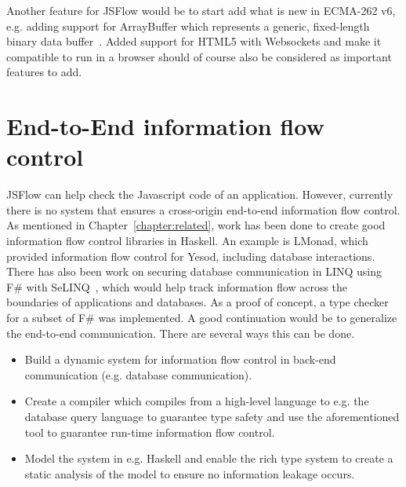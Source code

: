 Another feature for JSFlow would be to start add what is new in ECMA-262 v6, e.g. adding support for ArrayBuffer which represents a generic, fixed-length binary data buffer~\cite{js_arraybuffer}. Added support for HTML5 with Websockets and make it compatible to run in a browser should of course also be considered as important features to add.

\section{End-to-End information flow control}
JSFlow can help check the Javascript code of an application. However, currently there is no system that ensures a cross-origin end-to-end information flow control. As mentioned in Chapter~\ref{chapter:related}, work has been done to create good information flow control libraries in Haskell. An example is LMonad, which provided information flow control for Yesod, including database interactions. There has also been work on securing database communication in LINQ using F\# with SeLINQ~\cite{selinq}, which would help track information flow across the boundaries of applications and databases. As a proof of concept, a type checker for a subset of F\# was implemented. A good continuation would be to generalize the end-to-end communication. There are several ways this can be done.
\begin{itemize}
  \item Build a dynamic system for information flow control in back-end communication (e.g. database communication).
  \item Create a compiler which compiles from a high-level language to e.g. the database query language to guarantee type safety and use the aforementioned tool to guarantee run-time information flow control.
  \item Model the system in e.g. Haskell and enable the rich type system to create a static analysis of the model to ensure no information leakage occurs.
\end{itemize}
